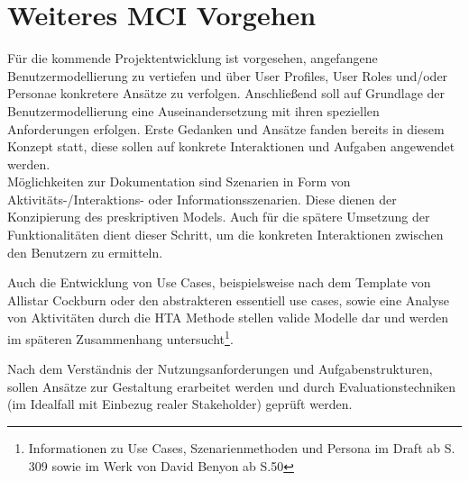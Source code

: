 
\section{Weiteres MCI Vorgehen}
Für die kommende Projektentwicklung ist vorgesehen, angefangene Benutzermodellierung zu vertiefen und über User Profiles, User Roles und/oder Personae konkretere Ansätze zu verfolgen. 
Anschließend soll auf Grundlage der Benutzermodellierung eine Auseinandersetzung mit ihren speziellen Anforderungen erfolgen. Erste Gedanken und Ansätze fanden bereits in diesem Konzept statt, diese sollen  auf konkrete Interaktionen und Aufgaben angewendet werden.\\
Möglichkeiten zur Dokumentation sind Szenarien in Form von Aktivitäts-/Interaktions- oder Informationsszenarien. Diese dienen der Konzipierung des preskriptiven Models. Auch für die spätere Umsetzung der Funktionalitäten dient dieser Schritt, um die konkreten Interaktionen zwischen den Benutzern zu ermitteln.

Auch die Entwicklung von Use Cases, beispielsweise nach dem Template von Allistar Cockburn oder den abstrakteren essentiell use cases, sowie eine Analyse von Aktivitäten durch die HTA Methode stellen valide Modelle dar und werden im späteren Zusammenhang untersucht\footnote{Informationen zu Use Cases, Szenarienmethoden und Persona im Draft ab S. 309 sowie im Werk von David Benyon ab S.50 }.  

Nach dem Verständnis der Nutzungsanforderungen und Aufgabenstrukturen, sollen Ansätze zur Gestaltung erarbeitet werden und durch Evaluationstechniken (im Idealfall mit Einbezug realer Stakeholder) geprüft werden.